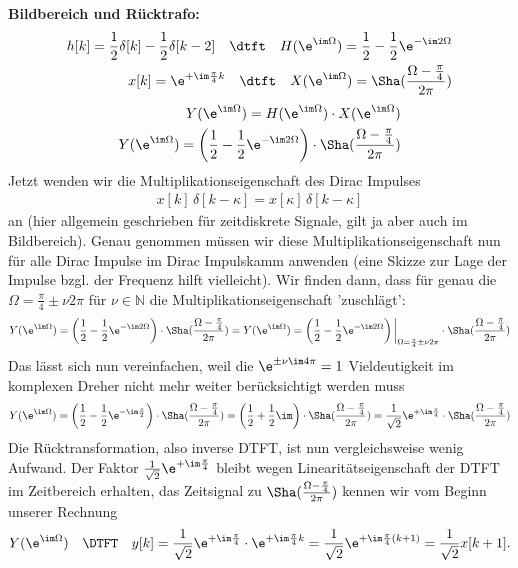 \begin{ExCalc}
\textbf{Bildbereich und Rücktrafo:}
\begin{align}
h[k] = \frac{1}{2}\delta[k] - \frac{1}{2}\delta[k-2]\quad\dtft\quad
H(\e^{\im\Omega}) = \frac{1}{2} - \frac{1}{2} \e^{-\im 2 \Omega}\\
x[k]=\e^{+\im \frac{\pi}{4} k} \quad\dtft\quad
X(\e^{\im\Omega}) = \Sha(\frac{\Omega-\frac{\pi}{4}}{2\pi})
\end{align}
%
\begin{align}
Y(\e^{\im\Omega}) = H(\e^{\im\Omega}) \cdot X(\e^{\im\Omega})\\
Y(\e^{\im\Omega}) = \left(\frac{1}{2} - \frac{1}{2} \e^{-\im 2 \Omega}\right)
\cdot
\Sha(\frac{\Omega-\frac{\pi}{4}}{2\pi})
\end{align}
%
Jetzt wenden wir die Multiplikationseigenschaft des Dirac Impulses
\begin{align}
x[k] \, \delta[k-\kappa] = x[\kappa] \, \delta[k-\kappa]
\end{align}
an (hier allgemein geschrieben für zeitdiskrete Signale, gilt ja aber auch im
Bildbereich).
%
Genau genommen müssen wir diese Multiplikationseigenschaft nun für alle Dirac Impulse
im Dirac Impulskamm anwenden (eine Skizze zur Lage der Impulse bzgl. der Frequenz
hilft vielleicht).
%
Wir finden dann, dass für genau die $\Omega=\frac{\pi}{4}\pm\nu 2\pi$ für $\nu\in\mathbb{N}$
die Multiplikationseigenschaft 'zuschlägt':
\begin{align}
Y(\e^{\im\Omega}) = \left(\frac{1}{2} - \frac{1}{2} \e^{-\im 2 \Omega}\right)
\cdot
\Sha(\frac{\Omega-\frac{\pi}{4}}{2\pi})
=
Y(\e^{\im\Omega}) = \left(\frac{1}{2} - \frac{1}{2} \e^{-\im 2 \Omega}\right)\bigg|_{\Omega=\frac{\pi}{4}\pm\nu 2\pi}
\cdot
\Sha(\frac{\Omega-\frac{\pi}{4}}{2\pi})
\end{align}
Das lässt sich nun vereinfachen, weil die $\e^{\pm \nu \im 4 \pi}=1$ Vieldeutigkeit
im komplexen Dreher nicht mehr weiter berücksichtigt werden muss
\begin{align}
Y(\e^{\im\Omega}) = \left(\frac{1}{2} - \frac{1}{2} \e^{-\im \frac{\pi}{2}}\right)
\cdot
\Sha(\frac{\Omega-\frac{\pi}{4}}{2\pi}) =
\left(\frac{1}{2} + \frac{1}{2} \im \right)
\cdot
\Sha(\frac{\Omega-\frac{\pi}{4}}{2\pi}) =
\frac{1}{\sqrt{2}} \e^{+\im\frac{\pi}{4}}\cdot\Sha(\frac{\Omega-\frac{\pi}{4}}{2\pi})
\end{align}
Die Rücktransformation, also inverse DTFT, ist nun vergleichsweise wenig Aufwand.
%
Der Faktor $\frac{1}{\sqrt{2}} \e^{+\im\frac{\pi}{4}}$ bleibt wegen Linearitätseigenschaft
der DTFT im Zeitbereich erhalten, das Zeitsignal zu $\Sha(\frac{\Omega-\frac{\pi}{4}}{2\pi})$
kennen wir vom Beginn unserer Rechnung
\begin{align}
Y(\e^{\im\Omega}) \quad\DTFT\quad y[k] = \frac{1}{\sqrt{2}} \e^{+\im\frac{\pi}{4}} \cdot \e^{+\im \frac{\pi}{4} k}=
\frac{1}{\sqrt{2}} \e^{+\im \frac{\pi}{4} (k+1)} = \frac{1}{\sqrt{2}} x[k+1].
\end{align}


\end{ExCalc}
